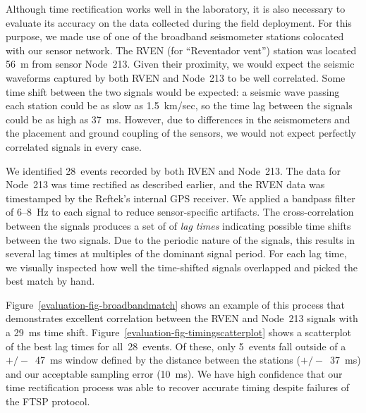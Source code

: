 Although time rectification works well in the laboratory, it is also
necessary to evaluate its accuracy on the data collected during the field
deployment. For this purpose, we made use of one of the broadband seismometer
stations colocated with our sensor network. The RVEN (for ``Reventador
vent'') station was located 56~m from sensor Node~213. Given their proximity,
we would expect the seismic waveforms captured by both RVEN and Node~213 to
be well correlated. Some time shift between the two signals would be
expected: a seismic wave passing each station could be as slow as 1.5~km/sec,
so the time lag between the signals could be as high as 37~ms. However, due
to differences in the seismometers and the placement and ground coupling of
the sensors, we would not expect perfectly correlated signals in every case.

\vfill\eject

We identified 28~events recorded by both RVEN and Node~213. The data for
Node~213 was time rectified as described earlier, and the RVEN data was
timestamped by the Reftek's internal GPS receiver. We applied a bandpass
filter of 6--8~Hz to each signal to reduce sensor-specific artifacts. The
cross-correlation between the signals produces a set of of \textit{lag times}
indicating possible time shifts between the two signals. Due to the periodic
nature of the signals, this results in several lag times at multiples of the
dominant signal period. For each lag time, we visually inspected how well the
time-shifted signals overlapped and picked the best match by hand.

Figure~\ref{evaluation-fig-broadbandmatch} shows an example of this process
that demonstrates excellent correlation between the RVEN and Node~213 signals
with a 29~ms time shift. Figure~\ref{evaluation-fig-timingscatterplot} shows
a scatterplot of the best lag times for all~28~events. Of these, only
5~events fall outside of a $+/-$~47~ms window defined by the distance between
the stations ($+/-$~37~ms) and our acceptable sampling error (10~ms). We have
high confidence that our time rectification process was able to recover
accurate timing despite failures of the FTSP protocol.

